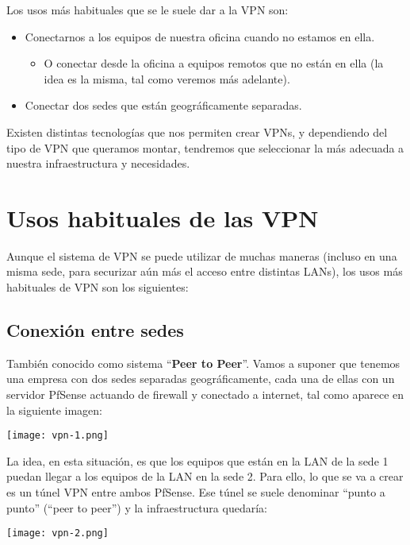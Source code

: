 Los usos más habituales que se le suele dar a la VPN son:

\begin{itemize}
    \item Conectarnos a los equipos de nuestra oficina cuando no estamos en ella.
    \begin{itemize}
        \item O conectar desde la oficina a equipos remotos que no están en ella (la idea es la misma, tal como veremos más adelante).
    \end{itemize}
    \item Conectar dos sedes que están geográficamente separadas.
\end{itemize}


Existen distintas tecnologías que nos permiten crear VPNs, y dependiendo del tipo de VPN que queramos montar, tendremos que seleccionar la más adecuada a nuestra infraestructura y necesidades.


\section{Usos habituales de las VPN}
Aunque el sistema de VPN se puede utilizar de muchas maneras (incluso en una misma sede, para securizar aún más el acceso entre distintas LANs), los usos más habituales de VPN son los siguientes:

\subsection{Conexión entre sedes}
También conocido como sistema “\textbf{Peer to Peer}”. Vamos a suponer que tenemos una empresa con dos sedes separadas geográficamente, cada una de ellas con un servidor PfSense actuando de firewall y conectado a internet, tal como aparece en la siguiente imagen:

\begin{center}
    \texttt{[image: vpn-1.png]}
\end{center}

La idea, en esta situación, es que los equipos que están en la LAN de la sede 1 puedan llegar a los equipos de la LAN en la sede 2. Para ello, lo que se va a crear es un túnel VPN entre ambos PfSense. Ese túnel se suele denominar “punto a punto” (“peer to peer”) y la infraestructura quedaría:

\begin{center}
    \texttt{[image: vpn-2.png]}
\end{center}


